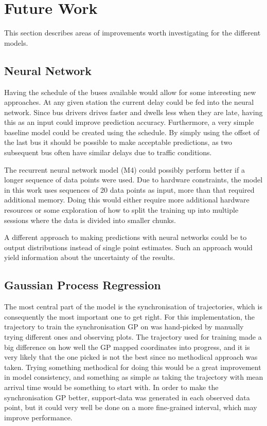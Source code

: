 \section{Future Work}
\label{sec:future-work}
This section describes areas of improvements worth investigating for the different models.

\subsection{Neural Network}
Having the schedule of the buses available would allow for some interesting new approaches. At any given station the current delay could be fed into the neural network. Since bus drivers drives faster and dwells less when they are late, having this as an input could improve prediction accuracy. Furthermore, a very simple baseline model could be created using the schedule. By simply using the offset of the last bus it should be possible to make acceptable predictions, as two subsequent bus often have similar delays due to traffic conditions.

The recurrent neural network model (M4) could possibly perform better if a longer sequence of data points were used. Due to hardware constraints, the model in this work uses sequences of 20 data points as input, more than that required additional memory. Doing this would either require more additional hardware resources or some exploration of how to split the training up into multiple sessions where the data is divided into smaller chunks.

A different approach to making predictions with neural networks could be to output distributions instead of single point estimates. Such an approach would yield information about the uncertainty of the results.

\subsection{Gaussian Process Regression}
The most central part of the model is the synchronisation of
trajectories, which is consequently the most important one to get
right. For this implementation, the trajectory to train the
synchronisation GP on was hand-picked by manually trying different
ones and observing plots. The trajectory used for training made a big
difference on how well the GP mapped coordinates into progress, and it
is very likely that the one picked is not the best since no methodical
approach was taken. Trying something methodical for doing this would
be a great improvement in model consistency, and something as simple as taking the
trajectory with mean arrival time would be something to start with. In
order to make the synchronisation GP better, support-data was generated
in each observed data point, but it could very well be done on a more
fine-grained interval, which may improve performance.


